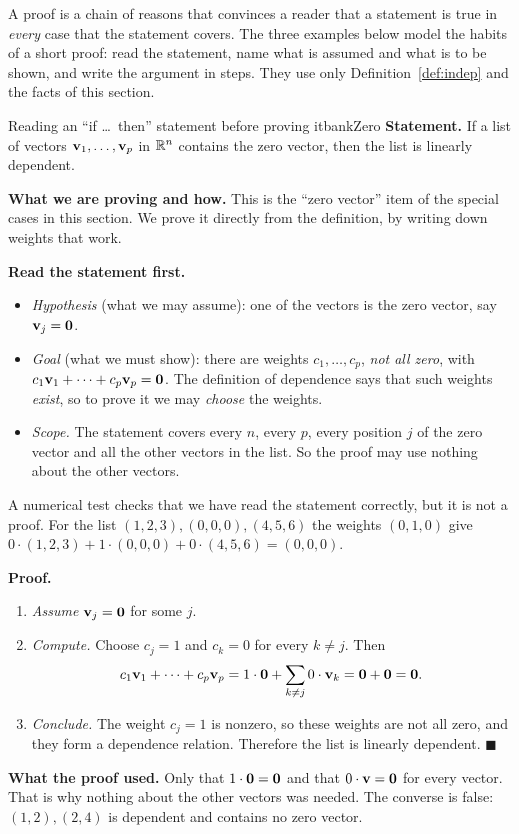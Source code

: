 \documentclass[11pt]{article}
\begin{document}
A proof is a chain of reasons that convinces a reader that a statement is true in \emph{every} case that the statement covers. The three examples below model the habits of a short proof: read the statement, name what is assumed and what is to be shown, and write the argument in steps. They use only Definition~\ref{def:indep} and the facts of this section.

\begin{exmp}{Reading an ``if \dots\ then'' statement before proving it}{bankZero}
\textbf{Statement.} If a list of vectors $\mathbf{v}_1,\dots,\mathbf{v}_p$ in $\mathbb{R}^n$ contains the zero vector, then the list is linearly dependent.

\textbf{What we are proving and how.} This is the ``zero vector'' item of the special cases in this section. We prove it directly from the definition, by writing down weights that work.

\textbf{Read the statement first.}
\begin{itemize}
  \item \emph{Hypothesis} (what we may assume): one of the vectors is the zero vector, say $\mathbf{v}_j=\mathbf{0}$.
  \item \emph{Goal} (what we must show): there are weights $c_1,\dots,c_p$, \emph{not all zero}, with $c_1\mathbf{v}_1+\cdots+c_p\mathbf{v}_p=\mathbf{0}$. The definition of dependence says that such weights \emph{exist}, so to prove it we may \emph{choose} the weights.
  \item \emph{Scope.} The statement covers every $n$, every $p$, every position $j$ of the zero vector and all the other vectors in the list. So the proof may use nothing about the other vectors.
\end{itemize}
A numerical test checks that we have read the statement correctly, but it is not a proof. For the list $(1,2,3),(0,0,0),(4,5,6)$ the weights $(0,1,0)$ give $0\cdot(1,2,3)+1\cdot(0,0,0)+0\cdot(4,5,6)=(0,0,0)$.

\textbf{Proof.}
\begin{enumerate}[itemsep=2pt]
  \item \emph{Assume} $\mathbf{v}_j=\mathbf{0}$ for some $j$.
  \item \emph{Compute.} Choose $c_j=1$ and $c_k=0$ for every $k\neq j$. Then
  \[
  c_1\mathbf{v}_1+\cdots+c_p\mathbf{v}_p=1\cdot\mathbf{0}+\sum_{k\neq j}0\cdot\mathbf{v}_k=\mathbf{0}+\mathbf{0}=\mathbf{0}.
  \]
  \item \emph{Conclude.} The weight $c_j=1$ is nonzero, so these weights are not all zero, and they form a dependence relation. Therefore the list is linearly dependent. \qquad$\blacksquare$
\end{enumerate}

\textbf{What the proof used.} Only that $1\cdot\mathbf{0}=\mathbf{0}$ and that $0\cdot\mathbf{v}=\mathbf{0}$ for every vector. That is why nothing about the other vectors was needed. The converse is false: $(1,2),(2,4)$ is dependent and contains no zero vector.
\end{exmp}
\end{document}
